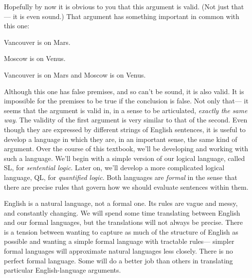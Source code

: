 Hopefully by now it is obvious to you that this argument is valid. (Not just that--- it is even sound.) That argument has something important in common with this one:

\begin{earg}
\item[] Vancouver is on Mars.
\item[] Moscow is on Venus.
\item[\therefore] Vancouver is on Mars and Moscow is on Venus.
\end{earg}

Although this one has false premises, and so can't be sound, it is also valid. It is impossible for the premises to be true if the conclusion is false. Not only that--- it seems that the argument is valid in, in a sense to be articulated, \emph{exactly the same way}. The validity of the first argument is very similar to that of the second. Even though they are expressed by different strings of English sentences, it is useful to develop a language in which they are, in an important sense, the same kind of argument. Over the course of this textbook, we'll be developing and working with such a language. We'll begin with a simple version of our logical language, called SL, for \emph{sentential logic}. Later on, we'll develop a more complicated logical language, QL, for \emph{quantified logic}. Both languages are \emph{formal} in the sense that there are precise rules that govern how we should evaluate sentences within them.

%

English is a natural language, not a formal one. Its rules are vague and messy, and constantly changing. We will spend some time translating between English and our formal languages, but the translations will not always be precise. There is a tension between wanting to capture as much of the structure of English as possible and wanting a simple formal language with tractable rules--- simpler formal languages will approximate natural languages less closely. There is no perfect formal language. Some will do a better job than others in translating particular English-language arguments.

